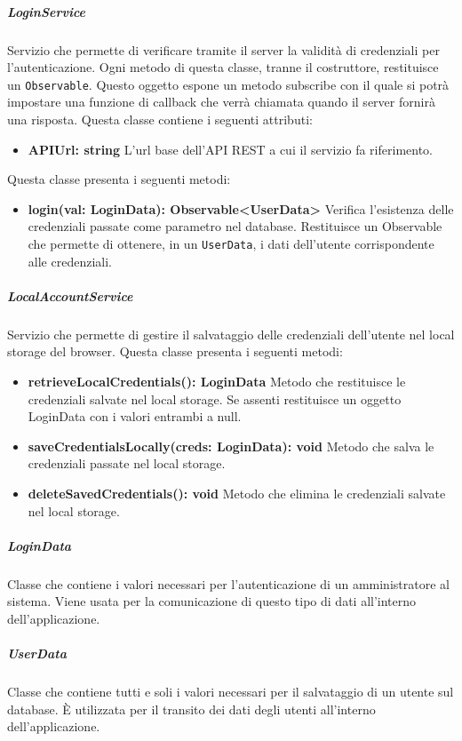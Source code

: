 \subparagraph{LoginService}
Servizio che permette di verificare tramite il server la validità di credenziali per l'autenticazione. Ogni metodo di questa classe, tranne il costruttore, restituisce un \texttt{Observable}. Questo oggetto espone un metodo subscribe con il quale si potrà impostare una funzione di callback che verrà chiamata quando il server fornirà una risposta. \newline
Questa classe contiene i seguenti attributi:
\begin{itemize}
	\item \textbf{APIUrl: string}
	L'url base dell'API REST a cui il servizio fa riferimento.
\end{itemize}
Questa classe presenta i seguenti metodi:
\begin{itemize}
	\item \textbf{login(val: LoginData): Observable<UserData>} \newline
	Verifica l'esistenza delle credenziali passate come parametro nel database. Restituisce un Observable che permette di ottenere, in un \texttt{UserData}, i dati dell'utente corrispondente alle credenziali.
\end{itemize}
\subparagraph{LocalAccountService}
Servizio che permette di gestire il salvataggio delle credenziali dell'utente nel local storage del browser. \newline
Questa classe presenta i seguenti metodi:
\begin{itemize}
	\item \textbf{retrieveLocalCredentials(): LoginData} \newline
	Metodo che restituisce le credenziali salvate nel local storage. Se assenti restituisce un oggetto LoginData con i valori entrambi a null.
	\item \textbf{saveCredentialsLocally(creds: LoginData): void} \newline
	Metodo che salva le credenziali passate nel local storage.
	\item \textbf{deleteSavedCredentials(): void} \newline
	Metodo che elimina le credenziali salvate nel local storage.
	
\end{itemize}
\subparagraph{LoginData}
Classe che contiene i valori necessari per l'autenticazione di un amministratore al sistema. Viene usata per la comunicazione di questo tipo di dati all'interno dell'applicazione. \newline
\subparagraph{UserData}
Classe che contiene tutti e soli i valori necessari per il salvataggio di un utente sul database. È utilizzata per il transito dei dati degli utenti all'interno dell'applicazione. \newline
